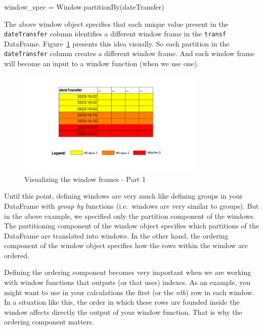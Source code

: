 \documentclass[
  11pt,
  letterpaper,
  DIV=11,
  numbers=noendperiod]{scrreprt}
\newenvironment{Shaded}{\begin{snugshade}}{\end{snugshade}}
\newcommand{\NormalTok}[1]{\textcolor[rgb]{0.00,0.23,0.31}{#1}}
\newcommand{\OperatorTok}[1]{\textcolor[rgb]{0.37,0.37,0.37}{#1}}
\newcommand{\StringTok}[1]{\textcolor[rgb]{0.13,0.47,0.30}{#1}}
\begin{document}
\begin{Shaded}
\begin{Highlighting}[]
\NormalTok{window\_spec }\OperatorTok{=}\NormalTok{ Window.partitionBy(}\StringTok{\textquotesingle{}dateTransfer\textquotesingle{}}\NormalTok{)}
\end{Highlighting}
\end{Shaded}

The above window object specifies that each unique value present in the
\texttt{dateTransfer} column identifies a different window frame in the
\texttt{transf} DataFrame. Figure~\ref{fig-window-spec1} presents this
idea visually. So each partition in the \texttt{dateTransfer} column
creates a different window frame. And each window frame will become an
input to a window function (when we use one).

\begin{figure}

{\centering \includegraphics[width=0.8\textwidth,height=\textheight]{Chapters/./../Figures/window-spec1.png}

}

\caption{\label{fig-window-spec1}Visualizing the window frames - Part 1}

\end{figure}

Until this point, defining windows are very much like defining groups in
your DataFrame with \emph{group by} functions (i.e.~windows are very
similar to groups). But in the above example, we specified only the
partition component of the windows. The partitioning component of the
window object specifies which partitions of the DataFrame are translated
into windows. In the other hand, the ordering component of the window
object specifies how the rows within the window are ordered.

Defining the ordering component becomes very important when we are
working with window functions that outputs (or that uses) indexes. As an
example, you might want to use in your calculations the first (or the
\emph{nth}) row in each window. In a situation like this, the order in
which these rows are founded inside the window affects directly the
output of your window function. That is why the ordering component
matters.
\end{document}
